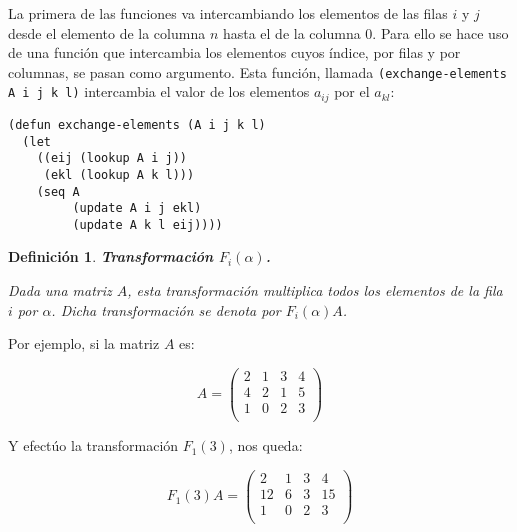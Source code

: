 \documentclass[a4paper,10pt]{article}
\newtheorem{defi}{{Definición}}
\begin{document}
La primera de las funciones va intercambiando los elementos de las filas $i$ y $j$ desde el elemento de la columna $n$ hasta el de la columna 0. Para ello se hace uso de una función que intercambia los elementos cuyos índice, por filas y por columnas, se pasan como argumento. Esta función, llamada \texttt{(exchange-elements A i j k l)} intercambia el valor de los elementos $a_{ij}$ por el $a_{kl}$:

\par \vspace{10pt}

\begin{lstlisting}[language=clips]
(defun exchange-elements (A i j k l)
  (let 
    ((eij (lookup A i j))
     (ekl (lookup A k l)))
    (seq A 
         (update A i j ekl)
         (update A k l eij))))
\end{lstlisting}

\par \vspace{12pt}

\begin{defi} \textbf{Transformación $F_i(\alpha)$.}\vspace{8pt}\par
Dada una matriz $A$, esta transformación multiplica todos los elementos de la fila $i$ por $\alpha$. Dicha transformación se denota por $F_i(\alpha)A$.
\end{defi}

\par \vspace{10pt}

Por ejemplo, si la matriz $A$ es:

\par \vspace{10pt}

$$
A=
\begin{pmatrix}
2 & 1 & 3 & 4 \\
4 & 2 & 1 & 5 \\
1 & 0 & 2 & 3 \\ 
\end{pmatrix}
$$ 

\par \vspace{10pt}

Y efectúo la transformación $F_1(3)$, nos queda:

\par \vspace{10pt}

$$
F_1(3)A=
\begin{pmatrix}
2 & 1 & 3 & 4 \\
12 & 6 & 3 & 15 \\
1 & 0 & 2 & 3 \\ 
\end{pmatrix}
$$ 
\end{document}
